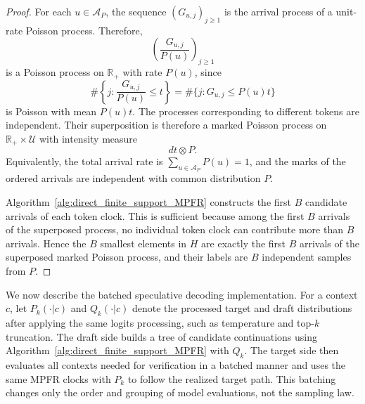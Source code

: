 \documentclass{article}
\theoremstyle{plain}
\theoremstyle{definition}
\begin{document}
\begin{proof}
For each $u\in\mathcal A_P$, the sequence $(G_{u,j})_{j\geq 1}$ is the arrival process of a unit-rate Poisson process. 
Therefore,
\[
\left(\frac{G_{u,j}}{P(u)}\right)_{j\geq 1}
\]
is a Poisson process on $\mathbb R_+$ with rate $P(u)$, since
\[
\#\left\{j:\frac{G_{u,j}}{P(u)}\leq t\right\}
=
\#\{j:G_{u,j}\leq P(u)t\}
\]
is Poisson with mean $P(u)t$. 
The processes corresponding to different tokens are independent. 
Their superposition is therefore a marked Poisson process on $\mathbb R_+\times\mathcal U$ with intensity measure
\[
dt\otimes P.
\]
Equivalently, the total arrival rate is $\sum_{u\in\mathcal A_P}P(u)=1$, and the marks of the ordered arrivals are independent with common distribution $P$.

Algorithm~\ref{alg:direct_finite_support_MPFR} constructs the first $B$ candidate arrivals of each token clock. 
This is sufficient because among the first $B$ arrivals of the superposed process, no individual token clock can contribute more than $B$ arrivals. 
Hence the $B$ smallest elements in $H$ are exactly the first $B$ arrivals of the superposed marked Poisson process, and their labels are $B$ independent samples from $P$.
\end{proof}


We now describe the batched speculative decoding implementation. 
For a context $c$, let $P_k(\cdot|c)$ and $Q_k(\cdot|c)$ denote the processed target and draft distributions after applying the same logits processing, such as temperature and top-$k$ truncation. 
The draft side builds a tree of candidate continuations using Algorithm~\ref{alg:direct_finite_support_MPFR} with $Q_k$. 
The target side then evaluates all contexts needed for verification in a batched manner and uses the same MPFR clocks with $P_k$ to follow the realized target path. 
This batching changes only the order and grouping of model evaluations, not the sampling law.
\end{document}
